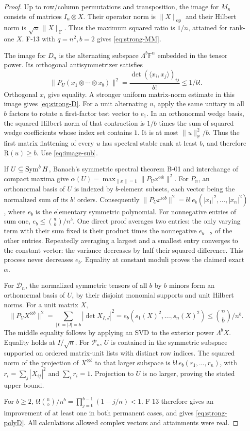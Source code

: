 \documentclass[11pt]{article}
\newcommand{\F}{\mathbb F}
\newcommand{\BR}{\underline{\mathrm R}}\newcommand{\TR}{\mathrm R}
\newcommand{\HS}[1]{\lVert #1\rVert_{\mathrm F}}
\newcommand{\op}[1]{\lVert #1\rVert_{\mathrm{op}}}
\begin{document}
\begin{proof}
Up to row/column permutations and transposition, the image for $M_n$
consists of matrices $I_n\otimes X$. Their operator norm is $\op X$
and their Hilbert norm is $\sqrt n\,\HS X$.
Thus the maximum squared ratio is $1/n$, attained for rank-one $X$.
F-13 with $q=n^2,b=2$ gives \eqref{eq:strong-MM}.

The image for $D_n$ is the alternating subspace $\Lambda^b\F^n$
embedded in the tensor power. Its orthogonal antisymmetrizer satisfies
\[
 \|P_U(x_1\otimes\cdots\otimes x_b)\|^2
     =\frac{\det(\langle x_i,x_j\rangle)_{ij}}{b!}\leq1/b!.
\]
Orthogonal $x_i$ give equality. A stronger uniform matrix-norm
estimate in this image gives \eqref{eq:strong-D}. For a unit
alternating $u$, apply the same unitary in all $b$ factors to
rotate a first-factor test vector to $e_1$.
In an orthonormal wedge basis, the squared Hilbert norm of that
contraction is $1/b$ times the sum of squared wedge coefficients
whose index set contains $1$. It is at most $\HS u^2/b$.
Thus the first matrix flattening of every $u$ has spectral stable
rank at least $b$, and therefore $\BR(u)\geq b$.
Use \eqref{eq:image-sub}.

If $U\subseteq\operatorname{Sym}^b H$, Banach's symmetric spectral theorem B-01
and interchange of compact maxima give
$\alpha(U)=\max_{\|x\|=1}\|P_Ux^{\otimes b}\|^2$.
For $P_n$, an orthonormal basis of $U$ is indexed by $b$-element
subsets, each vector being the normalized sum of its $b!$ orders.
Consequently
$\|P_Ux^{\otimes b}\|^2=b!\,e_b(|x_1|^2,\ldots,|x_n|^2)$,
where $e_b$ is the elementary symmetric polynomial.
For nonnegative entries of sum one,
$e_b\leq\binom nb/n^b$. One direct proof averages two entries:
the only varying term with their sum fixed is their product times
the nonnegative $e_{b-2}$ of the other entries. Repeatedly averaging
a largest and a smallest entry converges to the constant vector:
the variance decreases by half their squared difference.
This process never decreases $e_b$.
Equality at constant moduli proves the claimed exact $\alpha$.

For $\mathcal D_n$, the normalized symmetric tensors of all
$b$ by $b$ minors form an orthonormal basis of $U$, by their
disjoint monomial supports and unit Hilbert norms. For a unit
matrix $X$,
\[
 \|P_UX^{\otimes b}\|^2
 =\sum_{|I|=|J|=b}|\det X_{I,J}|^2
 =e_b(s_1(X)^2,\ldots,s_n(X)^2)
 \leq\binom nb/n^b .
\]
The middle equality follows by applying an SVD to the exterior
power $\Lambda^bX$. Equality holds at $I/\sqrt n$.
For $\mathcal P_n$, $U$ is contained in the symmetric subspace
supported on ordered matrix-unit lists with distinct row indices.
The squared norm of the projection of $X^{\otimes b}$ to that
larger subspace is $b!\,e_b(r_1,\ldots,r_n)$, with
$r_i=\sum_j|X_{ij}|^2$ and $\sum_i r_i=1$.
Projection to $U$ is no larger, proving the stated upper bound.

For $b\geq2$, $b!\binom nb/n^b=\prod_{j=0}^{b-1}(1-j/n)<1$.
F-13 therefore gives an improvement of at least one in both
permanent cases, and gives \eqref{eq:strong-polyD}.
All calculations allowed complex vectors and attainments were real.
\end{proof}
\end{document}
